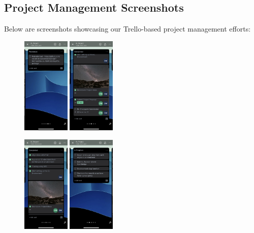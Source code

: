 \documentclass[conference]{IEEEtran}
\begin{document}
\subsection{Project Management Screenshots}
Below are screenshots showcasing our Trello-based project management efforts:

\begin{figure}[H]
\centering
\includegraphics[width=0.2\textwidth]{1.jpg}
\includegraphics[width=0.2\textwidth]{2.jpg}
\end{figure}
\vspace{-0.7cm}
\begin{figure}[H]
\centering
\includegraphics[width=0.2\textwidth]{3.jpg}
\includegraphics[width=0.2\textwidth]{4.jpg}
\end{figure}
\vspace{-0.7cm}
\end{document}
